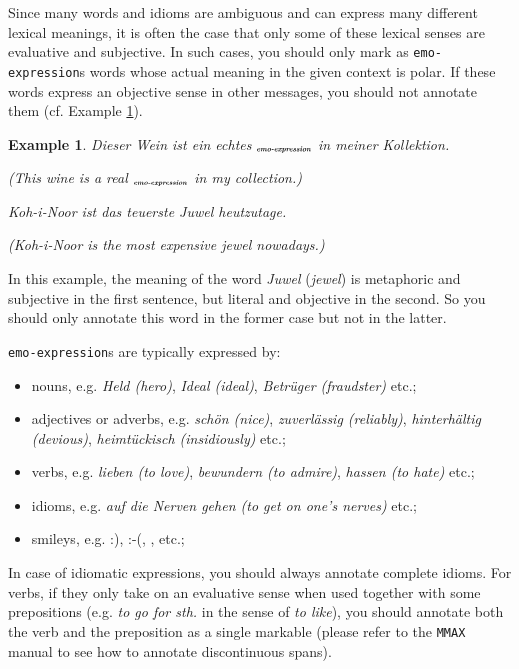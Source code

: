 \documentclass[11pt,a4paper]{article}
\theoremstyle{mytheoremstyle}
\newtheorem{exmp}{Example}[section]
\newcommand{\mtag}[2]{{\upshape[\emph{#2}\upshape]$_{\textrm{\bfseries\emph{\tiny
        #1}}}$}}
\newcommand{\emoexpression}[2][]{\mtag{emo-\-ex\-pression\ifstrempty{#1}{}{:#1}}{#2}}
\begin{document}
Since many words and idioms are ambiguous and can express many
different lexical meanings, it is often the case that only some of
these lexical senses are evaluative and subjective.  In such cases,
you should only mark as \texttt{emo-expression}s words whose actual
meaning in the given context is polar.  If these words express an
objective sense in other messages, you should not annotate them
(cf. Example \ref{exmp:emo-expression-jewel}).
\begin{exmp}
  Dieser Wein ist ein echtes \emoexpression{Juwel} in meiner
  Kollektion.

  (This wine is a real \emoexpression{jewel} in my collection.)

  Koh-i-Noor ist das teuerste Juwel heutzutage.

  (Koh-i-Noor is the most expensive jewel nowadays.)\label{exmp:emo-expression-jewel}
\end{exmp}
\noindent{}In this example, the meaning of the word \textit{Juwel}
(\textit{jewel}) is metaphoric and subjective in the first sentence,
but literal and objective in the second.  So you should only annotate
this word in the former case but not in the latter.

\texttt{emo-expression}s are typically expressed by:
\begin{itemize}
  \item nouns, e.g. \textit{Held (hero)}, \textit{Ideal (ideal)},
    \textit{Betr\"uger (fraudster)} etc.;

  \item adjectives or adverbs, e.g. \textit{sch\"on (nice)},
    \textit{zuverl\"assig (reliably)}, \textit{hinterh\"altig
      (devious)}, \textit{heimt\"uckisch (insidiously)} etc.;

  \item verbs, e.g. \textit{lieben (to love)}, \textit{bewundern (to
    admire)}, \textit{hassen (to hate)} etc.;

  \item idioms, e.g. \textit{auf die Nerven gehen (to get on one's
    nerves)} etc.;

  \item smileys, e.g. :), :-(, \smiley{}, \frownie{} etc.;
\end{itemize}
In case of idiomatic expressions, you should always annotate complete
idioms.  For verbs, if they only take on an evaluative sense when used
together with some prepositions (e.g. \textit{to go for sth.} in the
sense of \textit{to like}), you should annotate both the verb and the
preposition as a single markable (please refer to the \texttt{MMAX}
manual to see how to annotate discontinuous spans).
\end{document}
